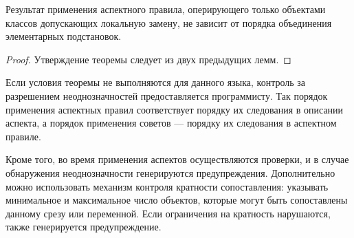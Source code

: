 \begin{Th}
Результат применения аспектного правила, оперирующего только объектами классов допускающих локальную замену, не зависит от порядка объединения элементарных подстановок.
\end{Th}
\begin{proof}
Утверждение теоремы следует из двух предыдущих лемм.
\end{proof}

Если условия теоремы не выполняются для данного языка, контроль за разрешением неоднозначностей предоставляется программисту. Так порядок применения аспектных правил соответствует порядку их следования в описании аспекта, а порядок применения советов --- порядку их следования в аспектном правиле. 

Кроме того, во время применения аспектов осуществляются проверки, и в случае обнаружения неоднозначности генерируются предупреждения.
Дополнительно можно использовать механизм контроля кратности сопоставления: указывать минимальное и максимальное число объектов, которые могут быть сопоставлены данному срезу или переменной. Если ограничения на кратность нарушаются, также генерируется предупреждение.